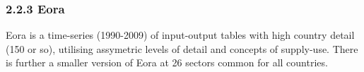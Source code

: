 \subsubsection{2.2.3 Eora}


Eora is a time-series (1990-2009) of input-output tables with high country detail (150 or so), utilising assymetric levels of detail and concepts of supply-use. There is further a smaller version of Eora at 26 sectors common for all countries.